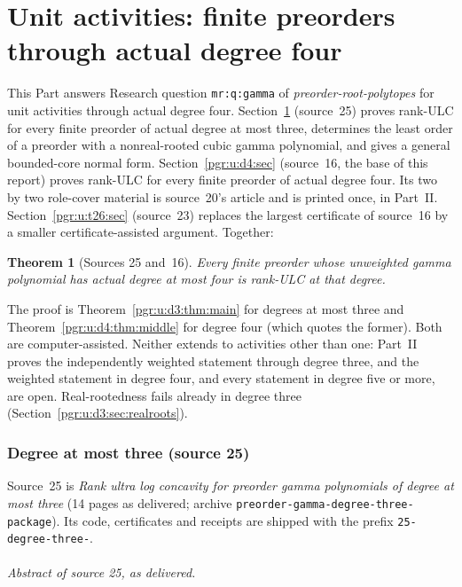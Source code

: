 \documentclass[11pt]{article}
\numberwithin{equation}{section}
\newtheorem{theorem}{Theorem}[section]\newtheorem{lemma}[theorem]{Lemma}\newtheorem{proposition}[theorem]{Proposition}\newtheorem{corollary}[theorem]{Corollary}
\theoremstyle{definition}\newtheorem{definition}[theorem]{Definition}\newtheorem{remark}[theorem]{Remark}
\newcommand{\prp}{\emph{preorder-root-polytopes}}
\begin{document}
\part{Unit activities: finite preorders through actual degree four}\label{pgr:part:one}

This Part answers Research question \texttt{mr:q:gamma} of \prp{} for
unit activities through actual degree four. Section~\ref{pgr:u:d3:sec}
(source~25) proves rank-ULC for every finite preorder of actual degree at
most three, determines the least order of a preorder with a nonreal-rooted
cubic gamma polynomial, and gives a general bounded-core normal form.
Section~\ref{pgr:u:d4:sec} (source~16, the base of this report) proves
rank-ULC for every finite preorder of actual degree four. Its two by two
role-cover material is source~20's article and is printed once, in
Part~II. Section~\ref{pgr:u:t26:sec} (source~23) replaces the largest
certificate of source~16 by a smaller certificate-assisted argument.
Together:

\begin{theorem}[Sources 25 and~16]\label{pgr:u:thm:summary}
Every finite preorder whose unweighted gamma polynomial has actual degree
at most four is rank-ULC at that degree.
\end{theorem}
The proof is Theorem~\ref{pgr:u:d3:thm:main} for degrees at most three and
Theorem~\ref{pgr:u:d4:thm:middle} for degree four (which quotes the former).
Both are computer-assisted. Neither extends to activities other than one:
Part~II proves the independently weighted statement through degree three,
and the weighted statement in degree four, and every statement in degree
five or more, are open. Real-rootedness fails already in degree three
(Section~\ref{pgr:u:d3:sec:realroots}).

\section{Degree at most three (source 25)}\label{pgr:u:d3:sec}

Source~25 is \emph{Rank ultra log concavity for preorder gamma polynomials
of degree at most three} (14 pages as delivered; archive
\texttt{preorder-gamma-degree-three-package}). Its code, certificates and
receipts are shipped with the prefix \texttt{25-degree-three-}.

\paragraph{Abstract of source 25, as delivered.}
\end{document}
